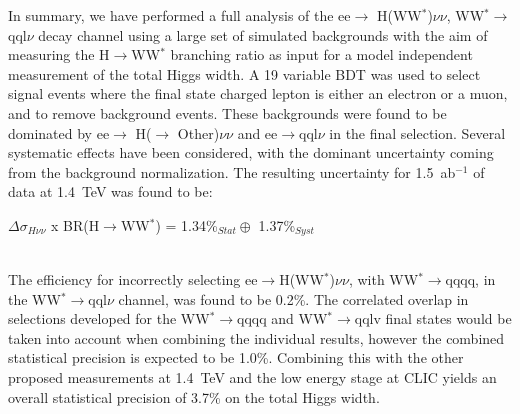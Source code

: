 In summary, we have performed a full analysis of the ee$\rightarrow$ H(WW$^*$)$\nu\nu$, WW$^*\rightarrow$qql$\nu$ decay channel using a large set of simulated backgrounds with the aim of measuring the H$\rightarrow$WW$^*$ branching ratio as input for a model independent measurement of the total Higgs width. A 19 variable BDT was used to select signal events where the final state charged lepton is either an electron or a muon, and to remove background events. These backgrounds were found to be dominated by ee$\rightarrow$ H($\rightarrow$ Other)$\nu\nu$  and ee$\rightarrow$qql$\nu$ in the final selection. Several systematic effects have been considered, with the dominant uncertainty coming from the background normalization. The resulting uncertainty for 1.5~ab$^{-1}$ of data at 1.4~TeV was found to be: \\[10pt]\centerline{\large{$\Delta\sigma_{H\nu\nu}$ x BR(H$\rightarrow$WW$^*$) = 1.34\%$_{Stat} \oplus$ 1.37\%$_{Syst}$}} \\[10pt] The efficiency for incorrectly selecting ee$\rightarrow$H(WW$^*$)$\nu\nu$, with WW$^*\rightarrow$qqqq, in the WW$^*\rightarrow$qql$\nu$ channel, was found to be 0.2\%. The correlated overlap in selections developed for the WW$^*\rightarrow$qqqq and WW$^*\rightarrow$qqlv final states would be taken into account when combining the individual results, however the combined statistical precision is expected to be 1.0\%. Combining this with the other proposed measurements at 1.4~TeV and the low energy stage at CLIC yields an overall statistical precision of 3.7\% on the total Higgs width\cite{Abramowicz:2016zbo}.



